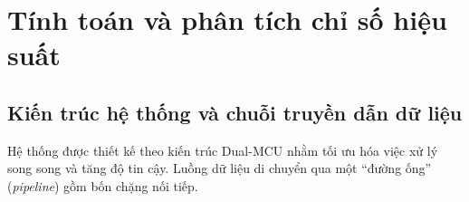 

\section{Tính toán và phân tích chỉ số hiệu suất}

\subsection{Kiến trúc hệ thống và chuỗi truyền dẫn dữ liệu}

        Hệ thống được thiết kế theo kiến trúc Dual-MCU nhằm tối ưu hóa việc xử lý song song và tăng độ tin cậy. Luồng dữ liệu di chuyển qua một ``đường ống'' (\textit{pipeline}) gồm bốn chặng nối tiếp.


